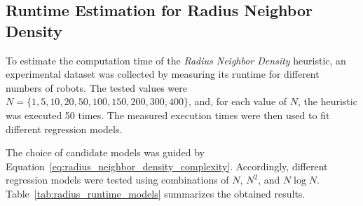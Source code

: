 \subsection{Runtime Estimation for Radius Neighbor Density}
\label{subsec:radius_runtime_estimation}
\hspace{\parindent}
To estimate the computation time of the \textit{Radius Neighbor Density} heuristic, an experimental
dataset was collected by measuring its runtime for different numbers of robots. The tested values
were \(N=\{1,5,10,20,50,100,150,200,300,400\}\), and, for each value of \(N\), the heuristic was
executed 50 times. The measured execution times were then used to fit different regression models.

The choice of candidate models was guided by Equation~\ref{eq:radius_neighbor_density_complexity}.
Accordingly, different regression models were tested using combinations of \(N\), \(N^2\), and
\(N\log N\). Table~\ref{tab:radius_runtime_models} summarizes the obtained results.

\begin{table}[H]
\centering
\caption{Regression models tested for estimating the computation time of the \textit{Radius Neighbor Density} heuristic.}
\label{tab:radius_runtime_models}
\small
\renewcommand{\arraystretch}{1.25}
\end{table}

